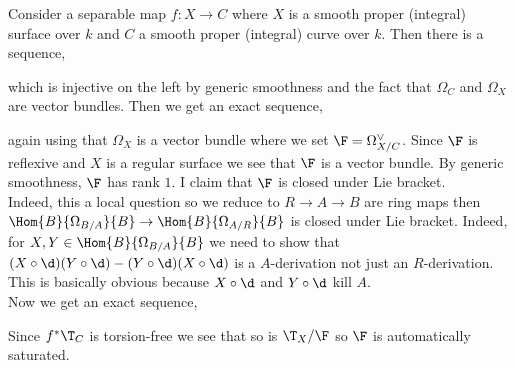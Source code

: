 \documentclass[12pt]{article}
\begin{document}
Consider a separable map $f : X \to C$ where $X$ is a smooth proper (integral) surface over $k$ and $C$ a smooth proper (integral) curve over $k$. Then there is a sequence,
\begin{center}
\end{center} 
which is injective on the left by generic smoothness and the fact that $\Omega_C$ and $\Omega_X$ are vector bundles. Then we get an exact sequence,
\begin{center}
\end{center}
again using that $\Omega_X$ is a vector bundle where we set $\F = \Omega_{X/C}^\vee$. Since $\F$ is reflexive and $X$ is a regular surface we see that $\F$ is a vector bundle. By generic smoothness, $\F$ has rank $1$. I claim that $\F$ is closed under Lie bracket. 
\bigskip\\
Indeed, this a local question so we reduce to $R  \to A \to B$ are ring maps then $\Hom{B}{\Omega_{B/A}}{B} \to \Hom{B}{\Omega_{A/R}}{B}$ is closed under Lie bracket. Indeed, for $X, Y \in \Hom{B}{\Omega_{B/A}}{B}$ we need to show that $(X \circ \d) (Y \circ \d) - (Y \circ \d) (X \circ \d)$ is a $A$-derivation not just an $R$-derivation. This is basically obvious because $X \circ \d$ and $Y \circ \d$ kill $A$. 
\bigskip\\
Now we get an exact sequence,
\begin{center}
\end{center}
Since $f^* \T_C$ is torsion-free we see that so is $\T_X / \F$ so $\F$ is automatically saturated. 
\end{document}
